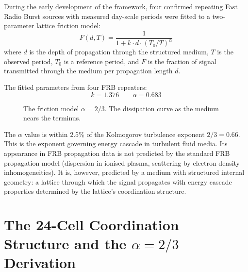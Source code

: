 \documentclass[11pt, letterpaper, openany]{book}
\begin{document}
During the early development of the framework, four confirmed repeating Fast
Radio Burst sources with measured day-scale periods were fitted to a two-parameter
lattice friction model:
\[
F(d, T) = \frac{1}{1 + k \cdot d \cdot (T_0/T)^\alpha}
\]
where $d$ is the depth of propagation through the structured medium, $T$ is
the observed period, $T_0$ is a reference period, and $F$ is the fraction of
signal transmitted through the medium per propagation length $d$.

The fitted parameters from four FRB repeaters:
\[
k = 1.376 \qquad \alpha = 0.683
\]

\begin{figure}[H]
\caption{The friction model $\alpha = 2/3$. The dissipation curve as the medium nears the terminus.}
\end{figure}

The $\alpha$ value is within 2.5\% of the Kolmogorov turbulence exponent
$2/3 = 0.6\overline{6}$. This is the exponent governing energy cascade
in turbulent fluid media. Its appearance in FRB propagation data is not
predicted by the standard FRB propagation model (dispersion in ionised
plasma, scattering by electron density inhomogeneities). It is, however,
predicted by a medium with structured internal geometry: a lattice through
which the signal propagates with energy cascade properties determined by
the lattice's coordination structure.

\section{The 24-Cell Coordination Structure and the $\alpha = 2/3$ Derivation}
\end{document}
